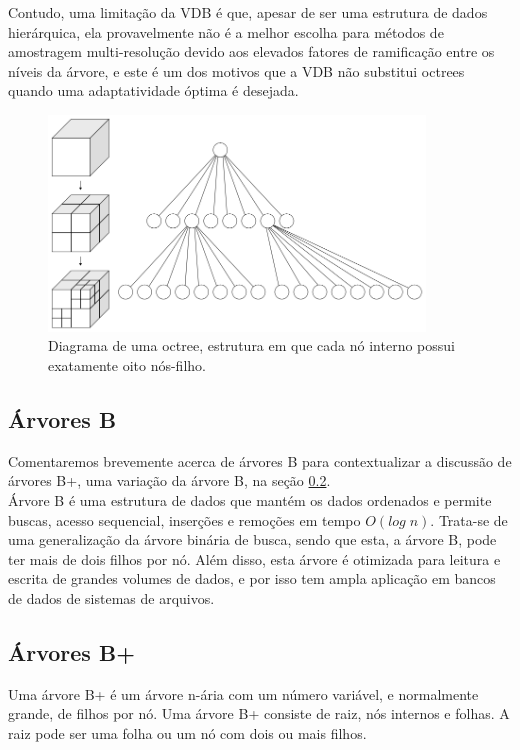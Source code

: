 \documentclass[12pt, a4paper, oneside]{book}
\begin{document}
Contudo, uma limitação da VDB é que, apesar de ser uma estrutura de dados hierárquica, ela provavelmente não é a melhor escolha para métodos de amostragem multi-resolução devido aos elevados fatores de ramificação entre os níveis da árvore, e este é um dos motivos que a VDB não substitui octrees quando uma adaptatividade óptima é desejada.

\begin{figure}[!htb]
\center
\includegraphics[width=10cm]{Octree2}
\caption{Diagrama de uma octree, estrutura em que cada nó interno possui exatamente oito nós-filho.}
\label{octree}
\end{figure}


\subsection{Árvores B}
Comentaremos brevemente acerca de árvores B para contextualizar a discussão de árvores B+, uma variação da árvore B, na seção \ref{bplus_trees}. \\

Árvore B é uma estrutura de dados que mantém os dados ordenados e permite buscas, acesso sequencial, inserções e remoções em tempo $O(log\;n)$. Trata-se de uma generalização da árvore binária de busca, sendo que esta, a árvore B, pode ter mais de dois filhos por nó. Além disso, esta árvore é otimizada para leitura e escrita de grandes volumes de dados, e por isso tem ampla aplicação em bancos de dados de sistemas de arquivos.

\subsection{Árvores B+}
\label{bplus_trees}
Uma árvore B+ é um árvore n-ária com um número variável, e normalmente grande, de filhos por nó. Uma árvore B+ consiste de raiz, nós internos e folhas. A raiz pode ser uma folha ou um nó com dois ou mais filhos.
\end{document}
